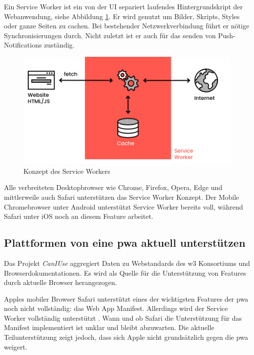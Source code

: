 Ein Service Worker ist ein von der UI separiert laufendes Hintergrundskript der Webanwendung, siehe Abbildung \ref{fig:serviceWorker}. Er wird genutzt um Bilder, Skripts, Styles oder ganze Seiten zu cachen. Bei bestehender Netzwerkverbindung führt er nötige Synchronisierungen durch. Nicht zuletzt ist er auch für das senden von Push-Notifications zuständig. \cite[S. 24]{BeginningPWA}

\begin{figure}[h]
        \includegraphics[width=\linewidth]{img/ServiceWorker-8a0968f1b295f1ff.png}
        \centering
        \caption{Konzept des Service Workers \cite{ServiceWorkerDiagramm}}
        \label{fig:serviceWorker}
\end{figure}


Alle verbreiteten Desktopbrowser wie Chrome, Firefox, Opera, Edge und mittlerweile auch Safari unterstützen das Service Worker Konzept. Der Mobile Chromebrowser unter Android unterstützt Service Worker bereits voll, während Safari unter iOS noch an diesem Feature arbeitet. \cite[S. 9]{BeginningPWA}


\subsection{Plattformen von eine \ac{pwa} aktuell unterstützen}
Das Projekt \textit{CanIUse} aggregiert Daten zu Webstandards des w3 Konsortiums und Browserdokumentationen. Es wird als Quelle für die Unterstützung von Features durch aktuelle Browser herangezogen.

Apples mobiler Browser Safari unterstützt eines der wichtigsten Features der \ac{pwa} noch nicht vollständig: das Web App Manifest. Allerdings wird der Service Worker vollständig unterstützt \cite{CanIUseWebManifest}. Wann und ob Safari die Unterstützung für das Manifest implementiert ist unklar und bleibt abzuwarten. Die aktuelle Teilunterstützung zeigt jedoch, dass sich Apple nicht grundsätzlich gegen die \ac{pwa} weigert.


